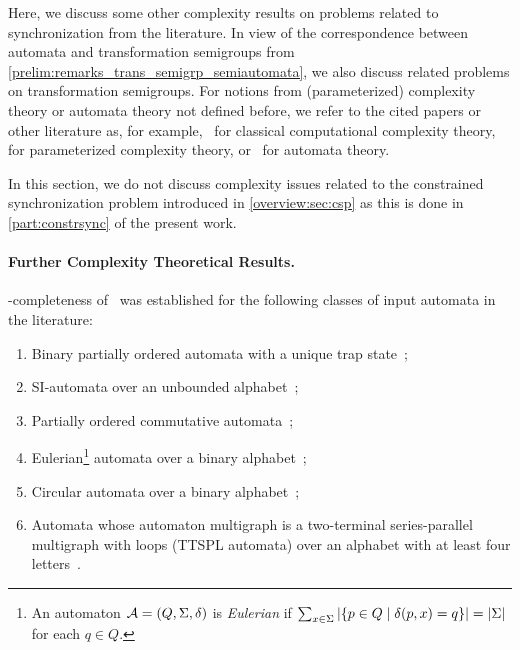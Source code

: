   
  
 Here, we discuss some other complexity results on problems related to synchronization from the literature.
 In view of the correspondence between automata
 and transformation semigroups from \cref{prelim:remarks_trans_semigrp_semiautomata}, 
 we also discuss related problems on transformation semigroups. 
 For notions from (parameterized) complexity
 theory or automata theory
 not defined before, we refer to the cited papers
 or other literature as, for example,~\cite{DBLP:books/daglib/0023084}
 for classical computational complexity theory,
 \cite{FluGro2006} for parameterized complexity theory, or~\cite{DBLP:reference/hfl/Pin97} for automata theory.
  
 In this section, we do not discuss complexity issues
 related to the constrained synchronization problem
 introduced in \cref{overview:sec:csp} as this is done in \cref{part:constrsync} of the present work.
  
\paragraph{Further Complexity Theoretical Results.} \NP-completeness of \DFASWS\ 
was established for the following classes of input automata in the literature:
\begin{enumerate}
\item \label{prelim:compl:discussion:pto} Binary partially ordered automata with a unique trap state~\cite{Eppstein90,Rys80};

\item SI-automata over an unbounded alphabet~\cite{DBLP:conf/fun/FernauH022,Mar2009b};

\item Partially ordered commutative automata~\cite{DBLP:conf/fun/FernauH022,DBLP:journals/jcss/FernauHV15,Mar2009b};

\item Eulerian\footnote{An automaton $\mathcal A = (Q, \Sigma, \delta)$ is \emph{Eulerian}
	if $\sum_{x\in \Sigma} | \{ p \in Q \mid \delta(p,x) = q \} |
	= |\Sigma|$ for each $q \in Q$.}
automata over a binary alphabet~\cite{DBLP:journals/iandc/Vorel17};

\item  Circular automata over a binary alphabet~\cite{DBLP:journals/tcs/Martyugin12};

\item Automata whose automaton multigraph is a two-terminal series-parallel multigraph with loops (TTSPL automata) over an alphabet with at least four letters~\cite{DBLP:journals/ita/BruchertseiferF21}.
\end{enumerate}

